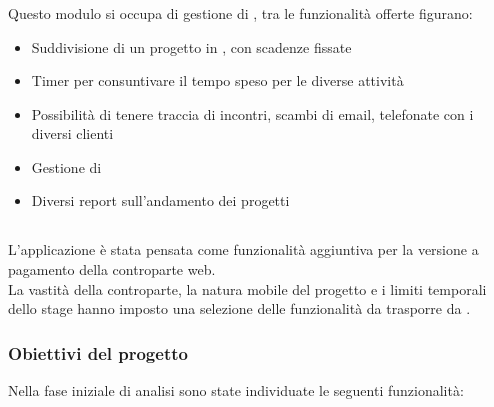 \subsubsection{\resa}
Questo modulo si occupa di gestione di , tra le funzionalità offerte
figurano:

\begin{itemize}
\item Suddivisione di un progetto in , con scadenze fissate
\item Timer per consuntivare il tempo speso per le diverse attività
\item Possibilità di tenere traccia di incontri, scambi di email, telefonate
con i diversi clienti
\item Gestione di 
\item Diversi report sull'andamento dei progetti
\end{itemize}

\subsection{\fiscoloMobile}
L'applicazione è stata pensata come funzionalità aggiuntiva per la versione
a pagamento della controparte web. \\
La vastità della controparte, la natura mobile del progetto e i limiti temporali
dello stage hanno imposto una selezione delle funzionalità da trasporre da
\fiscoloWeb{}.

\subsubsection{Obiettivi del progetto}\label{obiettivi}
Nella fase iniziale di analisi sono state individuate le seguenti funzionalità:

